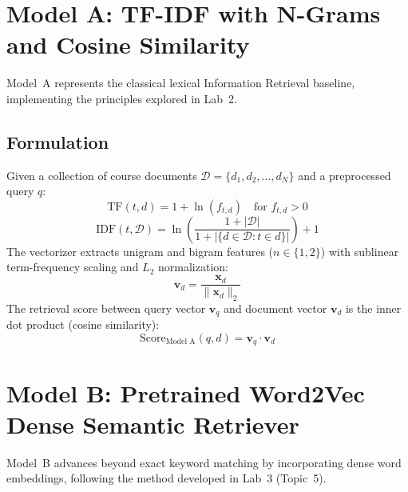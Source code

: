 \documentclass[12pt,a4paper]{report}
\begin{document}
\section{Model A: TF-IDF with N-Grams and Cosine Similarity}
Model~A represents the classical lexical Information Retrieval baseline, implementing the principles explored in Lab~2.

\subsection{Formulation}
Given a collection of course documents $\mathcal{D} = \{d_1, d_2, \dots, d_N\}$ and a preprocessed query $q$:
\begin{equation}
    \text{TF}(t, d) = 1 + \ln(f_{t, d}) \quad \text{for } f_{t,d} > 0
\end{equation}
\begin{equation}
    \text{IDF}(t, \mathcal{D}) = \ln\left(\frac{1 + |\mathcal{D}|}{1 + |\{d \in \mathcal{D} : t \in d\}|}\right) + 1
\end{equation}
The vectorizer extracts unigram and bigram features ($n \in \{1, 2\}$) with sublinear term-frequency scaling and $L_2$ normalization:
\begin{equation}
    \mathbf{v}_d = \frac{\mathbf{x}_d}{\|\mathbf{x}_d\|_2}
\end{equation}
The retrieval score between query vector $\mathbf{v}_q$ and document vector $\mathbf{v}_d$ is the inner dot product (cosine similarity):
\begin{equation}
    \text{Score}_{\text{Model A}}(q, d) = \mathbf{v}_q \cdot \mathbf{v}_d
\end{equation}

\section{Model B: Pretrained Word2Vec Dense Semantic Retriever}
Model~B advances beyond exact keyword matching by incorporating dense word embeddings, following the method developed in Lab~3 (Topic~5).
\end{document}
